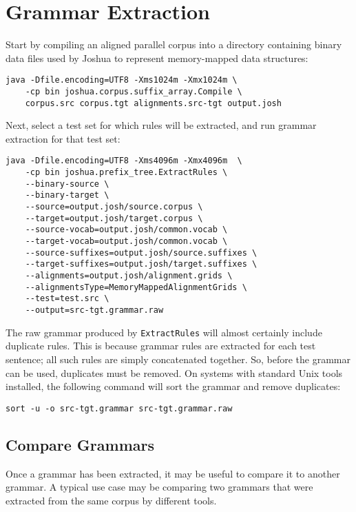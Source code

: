 \chapter{Grammar Extraction}
\label{ch:grammar-extraction}

Start by compiling an aligned parallel corpus into a directory containing binary data files used by Joshua to represent memory-mapped data structures:

\begin{verbatim}
java -Dfile.encoding=UTF8 -Xms1024m -Xmx1024m \
    -cp bin joshua.corpus.suffix_array.Compile \
    corpus.src corpus.tgt alignments.src-tgt output.josh
\end{verbatim}

Next, select a test set for which rules will be extracted, and run grammar extraction for that test set:

\begin{verbatim}
java -Dfile.encoding=UTF8 -Xms4096m -Xmx4096m  \
    -cp bin joshua.prefix_tree.ExtractRules \
    --binary-source \
    --binary-target \
    --source=output.josh/source.corpus \      
    --target=output.josh/target.corpus \      
    --source-vocab=output.josh/common.vocab \      
    --target-vocab=output.josh/common.vocab \  
    --source-suffixes=output.josh/source.suffixes \      
    --target-suffixes=output.josh/target.suffixes \
    --alignments=output.josh/alignment.grids \ 
    --alignmentsType=MemoryMappedAlignmentGrids \
    --test=test.src \
    --output=src-tgt.grammar.raw
\end{verbatim}

The raw grammar produced by {\tt ExtractRules} will almost certainly include duplicate rules. This is because grammar rules are extracted for each test sentence; all such rules are simply concatenated together. So, before the grammar can be used, duplicates must be removed. On systems with standard Unix tools installed, the following command will sort the grammar and remove duplicates:

\begin{verbatim}
sort -u -o src-tgt.grammar src-tgt.grammar.raw
\end{verbatim}

\section{Compare Grammars}

Once a grammar has been extracted, it may be useful to compare it to another grammar. A typical use case may be comparing two grammars that were extracted from the same corpus by different tools.

